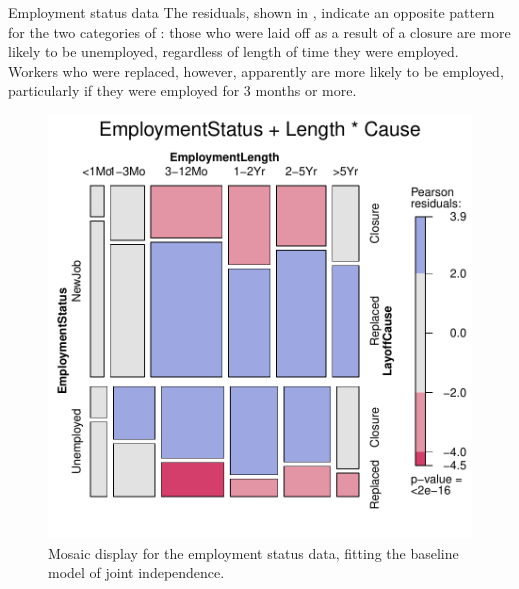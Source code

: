 \documentclass[11pt]{book}
\renewenvironment{knitrout}{\small\renewcommand{\baselinestretch}{.85}}{} %
\begin{document}
\begin{Example}[employ]{Employment status data}
The residuals, shown in ,
indicate an opposite pattern for the two categories of :
those who were laid off as a result of a closure
are more likely to be unemployed, regardless of length of time
they were employed.
Workers who were replaced, however, apparently are more likely
to be employed, particularly if they were employed for 3 months or more.

\begin{knitrout}
\color{fgcolor}\begin{kframe}
\begin{alltt}
 \hlstd{=}\hlstd{,}
        \hlstd{=} \hlopt{~}  \hlopt{+} \hlopt{*}
        \hlstd{=} \hlstd{)}
\end{alltt}
\end{kframe}\begin{figure}[!htbp]


\centerline{\includegraphics[width=.6\textwidth]{ch05/fig/employ-mos1} }

\caption[Mosaic display for the employment status data, fitting the baseline model of joint independence]{Mosaic display for the employment status data, fitting the baseline model of joint independence.\label{fig:employ-mos1}}
\end{figure}


\end{knitrout}


\end{Example}
\end{document}

